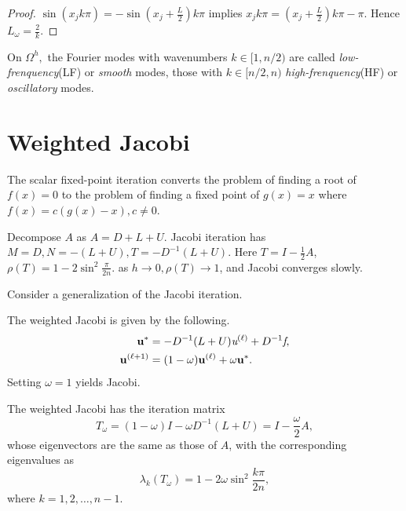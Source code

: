 \begin{proof}
  $\sin(x_jk\pi)=-\sin(x_j+\frac{L}{2})k\pi$
  implies $x_j k\pi=(x_j+\frac{L}{2})k\pi-\pi$.
  Hence $L_{\omega}=\frac{2}{k}.$
\end{proof}

\begin{defn}
  On $\Omega^h,$
  the Fourier modes with wavenumbers $k\in [1,n/2)$
  are called \emph{low-frenquency}(LF) or \emph{smooth} modes,
  those with $k\in [n/2,n)$ \emph{high-frenquency}(HF) or \emph{oscillatory}
  modes.
\end{defn}


\section{Weighted Jacobi}

\label{sec:weighted-jacobi}

The scalar fixed-point iteration converts the problem of finding
a root of $f(x)=0$ to the problem of finding a fixed point of $g(x)=x$
where $f(x)=c(g(x)-x),c\neq 0.$

Decompose $A$ as $A=D+L+U.$
Jacobi iteration has $M=D,N=-(L+U),T=-D^{-1}(L+U).$
Here $T=I-\frac{1}{2}A$, $\rho(T)=1-2\sin^2\frac{\pi}{2n}$.
as $h\rightarrow 0,\rho(T)\rightarrow 1$,
and Jacobi converges slowly.

Consider a generalization of the Jacobi iteration.

\begin{defn}
The weighted Jacobi is given by the following.
  \begin{align}
    \mathbf{u}^*&=-D^{-1}(L+U)\emph{u}^{(\ell)}+D^{-1}\emph{f},\\
    \mathbf{u}^{(\ell +1)}&=(1-\omega)\mathbf{u}^{(\ell)}+
                            \omega\mathbf{u}^*.
  \end{align}
  Setting $\omega=1$ yields Jacobi.
\end{defn}

\begin{prop}
  The weighted Jacobi has the iteration matrix
  \begin{equation}
    T_{\omega}=(1-\omega)I-\omega D^{-1}(L+U)=I-\frac{\omega}{2}A,
  \end{equation}
  whose eigenvectors are the same as those of $A$,
  with the corresponding eigenvalues as
  \begin{equation}
    \lambda_k(T_{\omega})=1-2\omega\sin^2\frac{k\pi}{2n},
  \end{equation}
  where $k = 1,2,\ldots,n-1$.
\end{prop}

